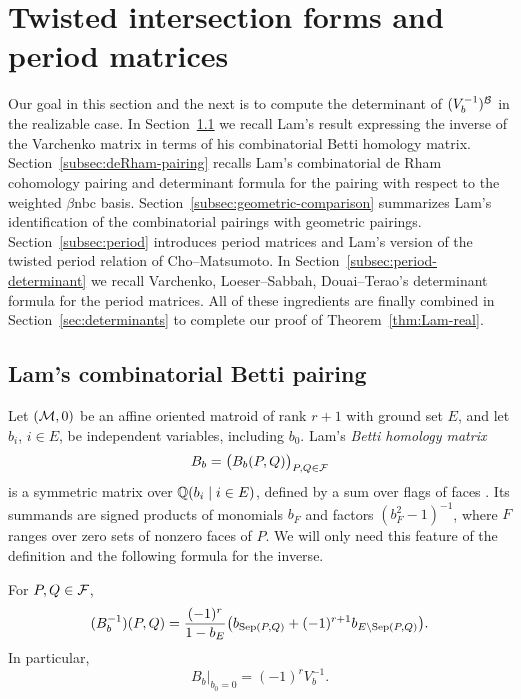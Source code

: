 \section{Twisted intersection forms and period matrices}\label{sec:periods}
Our goal in this section and the next is to compute the determinant of 
$(V_b^{-1})^{\mathcal B}$ in the realizable case.  In Section~\ref{subsec:betti-pairing} we recall Lam's result expressing the inverse of the Varchenko matrix in terms of his combinatorial Betti homology matrix.  Section~\ref{subsec:deRham-pairing} recalls Lam's combinatorial de Rham cohomology pairing and determinant formula for the pairing with respect to the weighted $\beta$nbc basis.  Section~\ref{subsec:geometric-comparison} summarizes Lam's identification of the combinatorial pairings with geometric pairings.  Section~\ref{subsec:period} introduces period matrices and Lam's version of the twisted period relation of Cho--Matsumoto.  In Section~\ref{subsec:period-determinant} we recall Varchenko, Loeser--Sabbah, Douai--Terao's determinant formula for the period matrices.  All of these ingredients are finally combined in Section~\ref{sec:determinants} to complete our proof of Theorem~\ref{thm:Lam-real}.


\subsection{Lam's combinatorial Betti pairing}\label{subsec:betti-pairing}
Let $(\mathcal M,0)$ be an affine oriented matroid of rank $r+1$ with ground set $E$, and let
$b_i$, $i\in E$, be independent variables, including $b_0$.
Lam's \emph{Betti homology matrix}
\[
 B_b=\bigl(B_b( P,Q) \bigr)_{P,Q\in\mathcal F}
\]
is a symmetric matrix over $\mathbb Q(b_i\mid i\in E)$, defined by a sum over
flags of faces \cite[Definition 8.2]{Lam}. Its summands are signed
products of monomials $b_F$ and factors $(b_F^2-1)^{-1}$, where $F$
ranges over zero sets of nonzero faces of $P$. We will only need this
feature of the definition and the following formula for the inverse.

\begin{proposition}\label{prop:Betti-Varchenko}
For $P,Q\in\mathcal F$,
\[
 (B_b^{-1})(P,Q)=\frac{(-1)^r}{1-b_E}
 \bigl(b_{\operatorname{Sep}(P,Q)}+(-1)^{r+1}b_{E\setminus\operatorname{Sep}(P,Q)}\bigr).
\]
In particular,
\[
 \left.B_b\right|_{b_0=0}=(-1)^rV_b^{-1}.
\]
\end{proposition}


